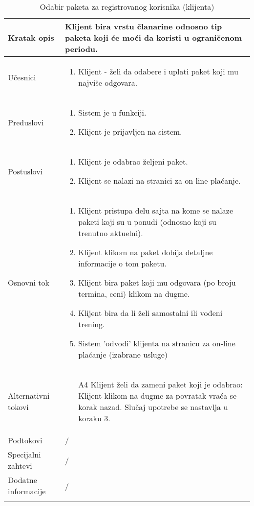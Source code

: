 \documentclass[../main.tex]{subfiles}
\begin{document}
\begin{longtable}{| p{} | p{} |} 

\hline
    Kratak opis & Klijent bira vrstu članarine odnosno tip paketa koji će moći da koristi u ograničenom periodu. \\ 
\hline    
    Učesnici & 
    	\begin{enumerate}
        \item Klijent - želi da odabere i uplati paket koji mu najviše odgovara.
     \end{enumerate}\\
\hline
   Preduslovi & \begin{enumerate}
       \item Sistem je u funkciji.
       \item Klijent je prijavljen na sistem.
   \end{enumerate}\\
\hline  
    Postuslovi & \begin{enumerate}
        \item Klijent je odabrao željeni paket.
        \item Klijent se nalazi na stranici za on-line plaćanje.
    \end{enumerate}\\
\hline
    Osnovni tok & \begin{enumerate}
        \item Klijent pristupa delu sajta na kome se nalaze paketi koji su u ponudi (odnosno koji su trenutno aktuelni).
        \item Klijent klikom na paket dobija detaljne informacije o tom paketu.
        \item Klijent bira paket koji mu odgovara (po broju termina, ceni) klikom na dugme.
        \item Klijent bira da li želi samostalni ili vođeni trening.
        \item Sistem 'odvodi' klijenta na stranicu za on-line plaćanje (izabrane usluge)
    \end{enumerate}\\
\hline
    Alternativni tokovi & \begin{itemize}
        \item[A4]  Klijent želi da zameni paket koji je odabrao: Klijent klikom na dugme za povratak vraća se korak nazad. Slučaj upotrebe se nastavlja u koraku 3.

    \end{itemize}\\
\hline
    Podtokovi & /\\
\hline
    Specijalni zahtevi & /\\
\hline
    Dodatne informacije & /\\
\hline
\caption{Odabir paketa za registrovanog korisnika (klijenta)} %
\end{longtable}
\end{document}
